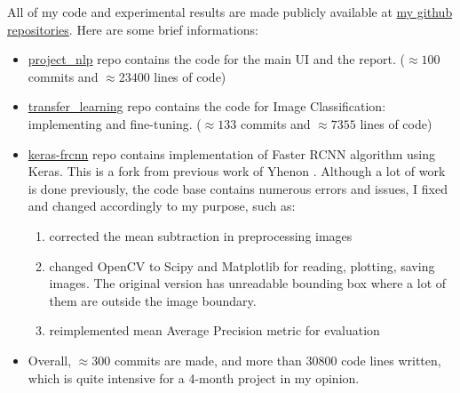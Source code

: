 All of my code and experimental results are made publicly available at  \href{https://github.com/vuhonganh?tab=repositories}{my github repositories}. Here are some brief informations:
\begin{itemize}
	\item \href{https://github.com/vuhonganh/project_nlp}{project\_nlp} repo contains the code for the main UI and the report. ($\approx 100$ commits and $\approx 23400$ lines of code)
	\item \href{https://github.com/vuhonganh/transfer_learning}{transfer\_learning} repo contains the code for Image Classification: implementing and fine-tuning. ($\approx 133$ commits and $\approx 7355$ lines of code)
	\item \href{https://github.com/vuhonganh/keras-frcnn}{keras-frcnn} repo contains implementation of Faster RCNN algorithm using Keras. This is a fork from previous work of Yhenon \cite{kerasFrcnn}. Although a lot of work is done previously, the code base contains numerous errors and issues, I fixed and changed accordingly to my purpose, such as:
	\begin{enumerate}
		\item corrected the mean subtraction in preprocessing images
		\item changed OpenCV to Scipy and Matplotlib for reading, plotting, saving images. The original version has unreadable bounding box where a lot of them are outside the image boundary.
		\item reimplemented mean Average Precision metric for evaluation
	\end{enumerate}
	\item Overall, $\approx 300$ commits are made, and more than $30800$ code lines written, which is quite intensive for a 4-month project in my opinion.
\end{itemize}


